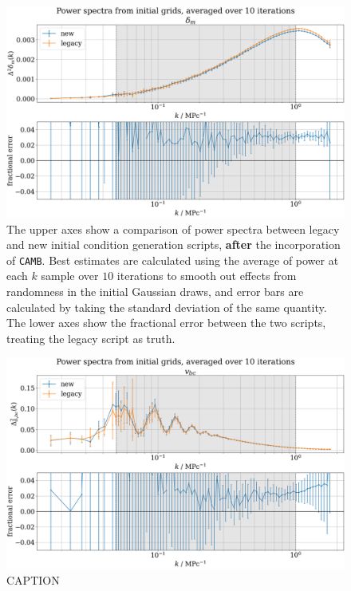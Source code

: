 \documentclass[floats,floatfix,showpacs,amssymb,prd,superscriptaddress,nofootinbib]{revtex4-2} %
\newcommand{\code}{\texttt}
\begin{document}
\newpage
\begin{figure}[H]
    \centering
    \includegraphics[width=0.9\columnwidth]{images/ic_power_spectra/compare_generators_averaged_power_spectra_with_residual_delta_m.png}
    \caption{The upper axes show a comparison of power spectra between legacy and new initial condition generation scripts, \textbf{after} the incorporation of \code{CAMB}. Best estimates are calculated using the average of power at each $k$ sample over $10$ iterations to smooth out effects from randomness in the initial Gaussian draws, and error bars are calculated by taking the standard deviation of the same quantity. The lower axes show the fractional error between the two scripts, treating the legacy script as truth.}
    \label{fig:compare_generators_power_spectrum_delta_m}
\end{figure}

\begin{figure}[H]
    \centering
    \includegraphics[width=0.9\columnwidth]{images/ic_power_spectra/compare_generators_averaged_power_spectra_with_residual_v_bc.png}
    \caption{CAPTION}
    \label{fig:compare_generators_power_spectrum_vbc}
\end{figure}
\end{document}
